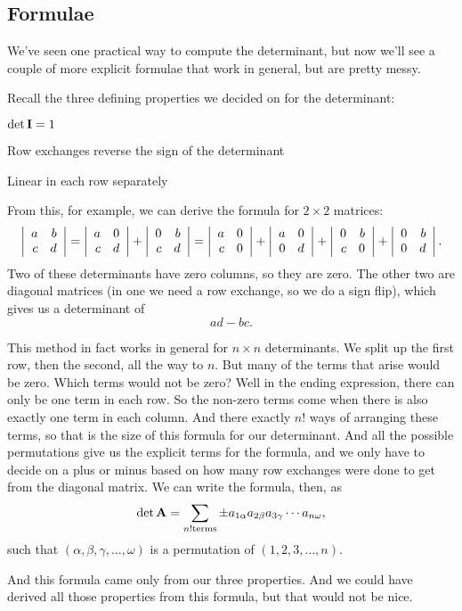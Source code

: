\subsection{Formulae}

We've seen one practical way to compute the determinant, but now we'll see a couple of more explicit formulae that work in general, but are pretty messy.

Recall the three defining properties we decided on for the determinant:
\bit
\item $\mathrm{det}\, \boldsymbol{\mathbf{I}} = 1$
\item Row exchanges reverse the sign of the determinant
\item Linear in each row separately
\eit

From this, for example, we can derive the formula for $2\times 2$ matrices:
\[ \left| \begin{array}{rrrrrrrrrrrrrrrrrrrrrrrrr} a&b\\c&d\\ \end{array} \right| =\left| \begin{array}{rrrrrrrrrrrrrrrrrrrrrrrrr} a&0\\c&d\\ \end{array} \right| + \left| \begin{array}{rrrrrrrrrrrrrrrrrrrrrrrrr} 0&b\\c&d\\ \end{array} \right| = \left| \begin{array}{rrrrrrrrrrrrrrrrrrrrrrrrr} a&0\\c&0\\ \end{array} \right| + \left| \begin{array}{rrrrrrrrrrrrrrrrrrrrrrrrr} a&0\\0&d\\ \end{array} \right| + \left| \begin{array}{rrrrrrrrrrrrrrrrrrrrrrrrr} 0&b\\c&0\\ \end{array} \right| + \left| \begin{array}{rrrrrrrrrrrrrrrrrrrrrrrrr} 0&b\\0&d\\ \end{array} \right|. \]
Two of these determinants have zero columns, so they are zero. The other two are diagonal matrices (in one we need a row exchange, so we do a sign flip), which gives us a determinant of
\[ ad - bc. \]

This method in fact works in general for $n \times n$ determinants. We split up the first row, then the second, all the way to $n$. But many of the terms that arise would be zero. Which terms would not be zero? Well in the ending expression, there can only be one term in each row. So the non-zero terms come when there is also exactly one term in each column. And there exactly $n!$ ways of arranging these terms, so that is the size of this formula for our determinant. And all the possible permutations give us the explicit terms for the formula, and we only have to decide on a plus or minus based on how many row exchanges were done to get from the diagonal matrix. We can write the formula, then, as
\[ \mathrm{det}\, \boldsymbol{\mathbf{A}} = \sum_{n! \mathrm{terms}} \pm a_{1\alpha} a_{2\beta} a_{3\gamma} \cdots a_{n\omega}, \]
such that $(\alpha,\beta,\gamma,\ldots,\omega)$ is a permutation of $(1,2,3,\ldots,n)$. 

And this formula came only from our three properties. And we could have derived all those properties from this formula, but that would not be nice. 


